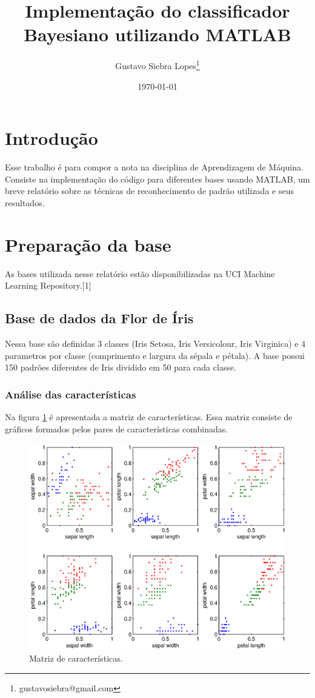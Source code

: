 \documentclass[a4paper]{article}
\title{ \textbf {Implementação do classificador Bayesiano utilizando MATLAB} }
\author{Gustavo Siebra Lopes\thanks{gustavosiebra@gmail.com}}
\date{\today}
\begin{document}
\maketitle


\section{Introdução}

Esse trabalho é para compor a nota na disciplina de Aprendizagem de Máquina. Consiste na implementação do código para diferentes bases usando MATLAB, um breve relatório sobre as técnicas de reconhecimento de padrão utilizada e seus resultados.


\section{Preparação da base}

As bases utilizada nesse relatório estão disponibilizadas na UCI Machine Learning Repository.[1]

\subsection{Base de dados da Flor de Íris}

Nessa base são definidas 3 classes (Iris Setosa, Iris Versicolour, Iris Virginica) e 4 parametros por classe (comprimento e largura da sépala e pétala). A base possui 150 padrões diferentes de Iris dividido em 50 para cada classe.

\subsubsection{Análise das características}
\label{sec:examples}

Na figura \ref{fig:Figura1} é apresentada a matriz de características. Essa matriz consiste de gráficos formados pelos pares de características combinadas.


\begin{figure}[H]
\centering

\includegraphics[height=9cm]{Imagens/myfig.eps}


\caption{Matriz de características.}
\label{fig:Figura1}
\end{figure}
\end{document}
